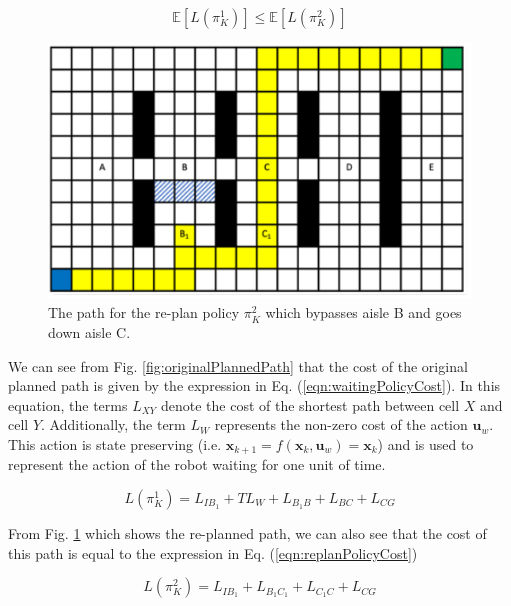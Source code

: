 \documentclass[a4paper,12pt]{article}
\begin{document}
			\begin{equation}
			\mathbb{E}\left[L\left(\pi_{K}^{1}\right)\right] \leq \mathbb{E}\left[L\left(\pi_{K}^{2}\right)\right]
			\label{eqn:costExpectation}
			\end{equation}
			
			\begin{figure}[H]
				\centering
				\includegraphics[scale=0.5]{images/replannedPathAisleB.png}
				\caption{The path for the re-plan policy $\pi_{K}^{2}$ which bypasses aisle B and goes down aisle C.}
				\label{fig:replannedPathAisleB}
			\end{figure}
			
			We can see from Fig. \ref{fig:originalPlannedPath} that the cost of the original planned path is given by the expression in Eq. (\ref{eqn:waitingPolicyCost}). In this equation, the terms $L_{XY}$ denote the cost of the shortest path between cell $X$ and cell $Y$. Additionally, the term $L_{W}$ represents the non-zero cost of the action $\boldsymbol{u}_w$. This action is state preserving (i.e. $\boldsymbol{x}_{k+1} = f(\boldsymbol{x}_k,\boldsymbol{u}_w) = \boldsymbol{x}_k$) and is used to represent the action of the robot waiting for one unit of time.
			
			\begin{equation}
			L\left(\pi_{K}^{1}\right) = L_{IB_{1}} + TL_W + L_{B_{1}B} + L_{BC} + L_{CG}
			\label{eqn:waitingPolicyCost}
			\end{equation}
			
			From Fig. \ref{fig:replannedPathAisleB} which shows the re-planned path, we can also see that the cost of this path is equal to the expression in Eq. (\ref{eqn:replanPolicyCost})
			
			\begin{equation}
			L\left(\pi_{K}^{2}\right) = L_{IB_{1}} + L_{B_{1}C_{1}} + L_{C_{1}C} + L_{CG}
			\label{eqn:replanPolicyCost}
			\end{equation}
			
\end{document}
